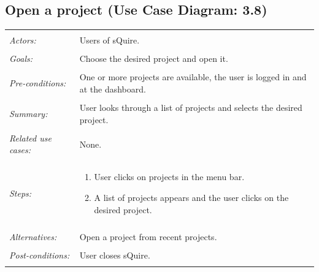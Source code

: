\documentclass[11pt]{report}
\begin{document}
\subsection{Open a project (Use Case Diagram: 3.8)}
\begin{tabular}{ p{2cm} p{12cm} }
 \hline
 \\
 \textit{Actors:} & Users of sQuire. \\ 
 \\
 \textit{Goals:} & Choose the desired project and open it. \\
 \\
 \textit{Pre-conditions:} & One or more projects are available, the user is logged in and at the dashboard. \\
 \\
 \textit{Summary:} & User looks through a list of projects and selects the desired project. \\ 
 \\
 \textit{Related use cases:} & None. \\ 
 \\
 \textit{Steps:} & \begin{enumerate}
  \item User clicks on projects in the menu bar.
  \item A list of projects appears and the user clicks on the desired project.
 \end{enumerate} \\
 \\
 \textit{Alternatives:} & Open a project from recent projects. \\
 \\
 \textit{Post-conditions:} & User closes sQuire. \\
 \\
\hline
\end{tabular}
\end{document}
